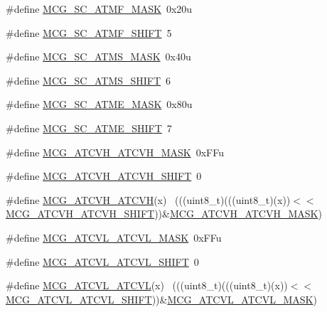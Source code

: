 \begin{DoxyCompactItemize}
\#define \hyperlink{group___m_c_g___register___masks_ga15326687d7d214b4847a3cae6e6cdfaa}{M\+C\+G\+\_\+\+S\+C\+\_\+\+A\+T\+M\+F\+\_\+\+M\+A\+SK}~0x20u
\item 
\#define \hyperlink{group___m_c_g___register___masks_gac7fd1ff91fc1de6800a18f875398d966}{M\+C\+G\+\_\+\+S\+C\+\_\+\+A\+T\+M\+F\+\_\+\+S\+H\+I\+FT}~5
\item 
\#define \hyperlink{group___m_c_g___register___masks_gaf5a12b51cc62a0ce10f3fbecdebd0222}{M\+C\+G\+\_\+\+S\+C\+\_\+\+A\+T\+M\+S\+\_\+\+M\+A\+SK}~0x40u
\item 
\#define \hyperlink{group___m_c_g___register___masks_ga9a8ce406d5868276e9c3b37190ab89b1}{M\+C\+G\+\_\+\+S\+C\+\_\+\+A\+T\+M\+S\+\_\+\+S\+H\+I\+FT}~6
\item 
\#define \hyperlink{group___m_c_g___register___masks_gaf9545e815c86bd04d8513af024cb8617}{M\+C\+G\+\_\+\+S\+C\+\_\+\+A\+T\+M\+E\+\_\+\+M\+A\+SK}~0x80u
\item 
\#define \hyperlink{group___m_c_g___register___masks_ga146594251d4266d02fecc44c1f0dd6ae}{M\+C\+G\+\_\+\+S\+C\+\_\+\+A\+T\+M\+E\+\_\+\+S\+H\+I\+FT}~7
\item 
\#define \hyperlink{group___m_c_g___register___masks_gaf989f84acb1a8c91c7c98c2255651b00}{M\+C\+G\+\_\+\+A\+T\+C\+V\+H\+\_\+\+A\+T\+C\+V\+H\+\_\+\+M\+A\+SK}~0x\+F\+Fu
\item 
\#define \hyperlink{group___m_c_g___register___masks_ga0fec2d450a98ab78dc7a2e4e9e33dbc6}{M\+C\+G\+\_\+\+A\+T\+C\+V\+H\+\_\+\+A\+T\+C\+V\+H\+\_\+\+S\+H\+I\+FT}~0
\item 
\#define \hyperlink{group___m_c_g___register___masks_gabc2689bb75b7c4cc672293dd43cdcc9d}{M\+C\+G\+\_\+\+A\+T\+C\+V\+H\+\_\+\+A\+T\+C\+VH}(x)                                          ~(((uint8\+\_\+t)(((uint8\+\_\+t)(x))$<$$<$\hyperlink{group___m_c_g___register___masks_ga0fec2d450a98ab78dc7a2e4e9e33dbc6}{M\+C\+G\+\_\+\+A\+T\+C\+V\+H\+\_\+\+A\+T\+C\+V\+H\+\_\+\+S\+H\+I\+FT}))\&\hyperlink{group___m_c_g___register___masks_gaf989f84acb1a8c91c7c98c2255651b00}{M\+C\+G\+\_\+\+A\+T\+C\+V\+H\+\_\+\+A\+T\+C\+V\+H\+\_\+\+M\+A\+SK})
\item 
\#define \hyperlink{group___m_c_g___register___masks_ga48750526150212b524f731e303a7e3cf}{M\+C\+G\+\_\+\+A\+T\+C\+V\+L\+\_\+\+A\+T\+C\+V\+L\+\_\+\+M\+A\+SK}~0x\+F\+Fu
\item 
\#define \hyperlink{group___m_c_g___register___masks_ga9e3e0eab24aaf1bf2905ae0cf4803eb3}{M\+C\+G\+\_\+\+A\+T\+C\+V\+L\+\_\+\+A\+T\+C\+V\+L\+\_\+\+S\+H\+I\+FT}~0
\item 
\#define \hyperlink{group___m_c_g___register___masks_gac69adca2b6c2222d1f35d7194b82ee41}{M\+C\+G\+\_\+\+A\+T\+C\+V\+L\+\_\+\+A\+T\+C\+VL}(x)                                          ~(((uint8\+\_\+t)(((uint8\+\_\+t)(x))$<$$<$\hyperlink{group___m_c_g___register___masks_ga9e3e0eab24aaf1bf2905ae0cf4803eb3}{M\+C\+G\+\_\+\+A\+T\+C\+V\+L\+\_\+\+A\+T\+C\+V\+L\+\_\+\+S\+H\+I\+FT}))\&\hyperlink{group___m_c_g___register___masks_ga48750526150212b524f731e303a7e3cf}{M\+C\+G\+\_\+\+A\+T\+C\+V\+L\+\_\+\+A\+T\+C\+V\+L\+\_\+\+M\+A\+SK})

\end{DoxyCompactItemize}
